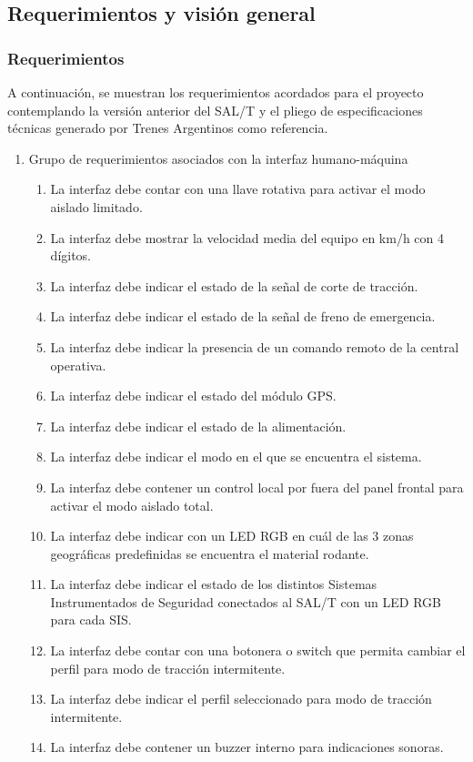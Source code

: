 
\subsection{Requerimientos y visión general}

\subsubsection{Requerimientos}

A continuación, se muestran los requerimientos acordados para el proyecto contemplando la versión anterior del SAL/T y el pliego de especificaciones técnicas generado por Trenes Argentinos como referencia. 


\begin{enumerate}
    \item Grupo de requerimientos asociados con la interfaz humano-máquina
    \begin{enumerate}
        \item La interfaz debe contar con una llave rotativa para activar el modo aislado limitado.
        \item La interfaz debe mostrar la velocidad media del equipo en km/h con 4 dígitos.
        \item La interfaz debe indicar el estado de la señal de corte de tracción.
        \item La interfaz debe indicar el estado de la señal de freno de emergencia.
        \item La interfaz debe indicar la presencia de un comando remoto de la central operativa.
        \item La interfaz debe indicar el estado del módulo GPS.
        \item La interfaz debe indicar el estado de la alimentación.
        \item La interfaz debe indicar el modo en el que se encuentra el sistema.
        \item La interfaz debe contener un control local por fuera del panel frontal para activar el modo aislado total.
        \item La interfaz debe indicar con un LED RGB en cuál de las 3 zonas geográficas predefinidas se encuentra el material rodante. 
        \item La interfaz debe indicar el estado de los distintos Sistemas Instrumentados de Seguridad conectados al SAL/T con un LED RGB para cada SIS.
        \item La interfaz debe contar con una botonera o switch que permita cambiar el perfil para modo de tracción intermitente.
        \item La interfaz debe indicar el perfil seleccionado para modo de tracción intermitente.
        \item La interfaz debe contener un buzzer interno para indicaciones sonoras.
    \end{enumerate}
       

\end{enumerate}
